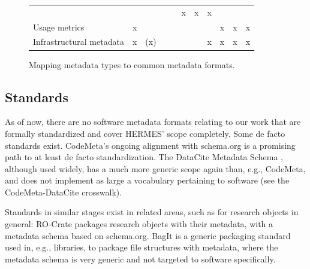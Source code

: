 \documentclass{article}
\begin{document}
\begin{figure}
\begin{tabular}{lllllllllll}
& 

& 

& 

& 

& x

& x

& x

\\
Usage metrics

& x

& 

& 

& 

& 

& 

& 

& x

& x

& x

\\
Infrastructural metadata

& x

& (x)

& 

& 

& 

& 

& x

& x

& x

& x

\\
\end{tabular}
\caption{Mapping metadata types to common metadata formats.}
\label{y2o46dfd3ike}
\end{figure}

\subsection{Standards}\label{oz9xdugqw4t}
As of now, there are no software metadata formats relating to our work that are formally standardized and cover HERMES’ scope completely. Some de facto standards exist. CodeMeta’s ongoing alignment with schema.org is a promising path to at least de facto standardization. The DataCite Metadata Schema \cite{138880/AJSS9RWC}, although used widely, has a much more generic scope again than, e.g., CodeMeta, and does not implement as large a vocabulary pertaining to software (see the CodeMeta-DataCite crosswalk).

Standards in similar stages exist in related areas, such as for research objects in general: RO-Crate \cite{138880/S5F3HZ96} packages research objects with their metadata, with a metadata schema based on schema.org. BagIt \cite{138880/CE9VUDMM} is a generic packaging standard used in, e.g., libraries, to package file structures with metadata, where the metadata schema is very generic and not targeted to software specifically.
\end{document}
